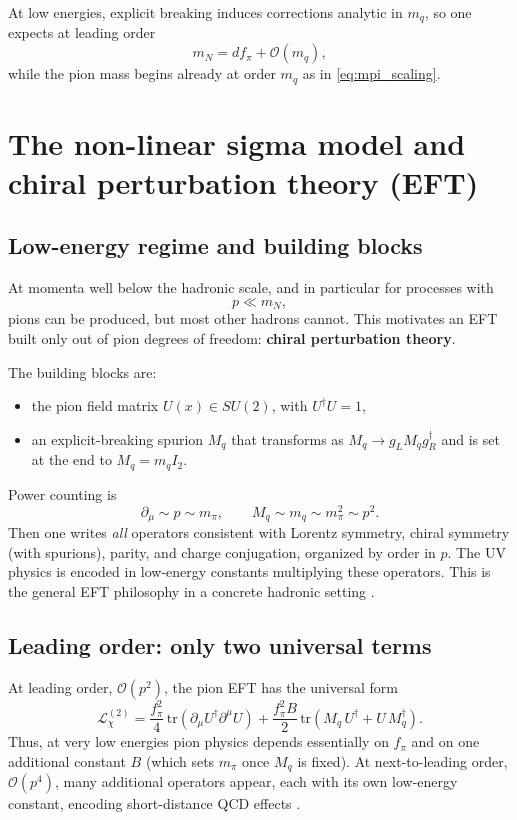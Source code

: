 At low energies, explicit breaking induces corrections analytic in $m_q$,
so one expects at leading order
\begin{equation}
m_N = d f_\pi + \mathcal{O}(m_q),
\end{equation}
while the pion mass begins already at order $m_q$ as in \eqref{eq:mpi_scaling}.

\section{The non-linear sigma model and chiral perturbation theory (EFT)}

\subsection{Low-energy regime and building blocks}

At momenta well below the hadronic scale, and in particular for processes with
\begin{equation}
p \ll m_N,
\end{equation}
pions can be produced, but most other hadrons cannot. This motivates an EFT built
only out of pion degrees of freedom: \textbf{chiral perturbation theory}.

The building blocks are:
\begin{itemize}
  \item the pion field matrix $U(x)\in SU(2)$, with $U^\dagger U=1$,
  \item an explicit-breaking spurion $M_q$ that transforms as $M_q\to g_L M_q g_R^\dagger$
  and is set at the end to $M_q=m_q I_2$.
\end{itemize}
Power counting is
\begin{equation}
\partial_\mu \sim p \sim m_\pi,
\qquad
M_q \sim m_q \sim m_\pi^2 \sim p^2.
\end{equation}
Then one writes \emph{all} operators consistent with Lorentz symmetry,
chiral symmetry (with spurions), parity, and charge conjugation, organized
by order in $p$. The UV physics is encoded in low-energy constants multiplying
these operators. This is the general EFT philosophy in a concrete hadronic setting
\citep{donoghue1992,schwartz2014,weinberg1995qtf1}.

\subsection{Leading order: only two universal terms}

At leading order, $\mathcal{O}(p^2)$, the pion EFT has the universal form
\begin{equation}
\mathcal{L}^{(2)}_{\chi}
=
\frac{f_\pi^2}{4}\,\mathrm{tr}\!\left(\partial_\mu U^\dagger \partial^\mu U\right)
+
\frac{f_\pi^2 B}{2}\,\mathrm{tr}\!\left(M_q\,U^\dagger + U\,M_q^\dagger\right).
\label{eq:chpt_LO}
\end{equation}
Thus, at very low energies pion physics depends essentially on $f_\pi$ and on one
additional constant $B$ (which sets $m_\pi$ once $M_q$ is fixed).
At next-to-leading order, $\mathcal{O}(p^4)$, many additional operators appear,
each with its own low-energy constant, encoding short-distance QCD effects
\citep{donoghue1992,schwartz2014}.

